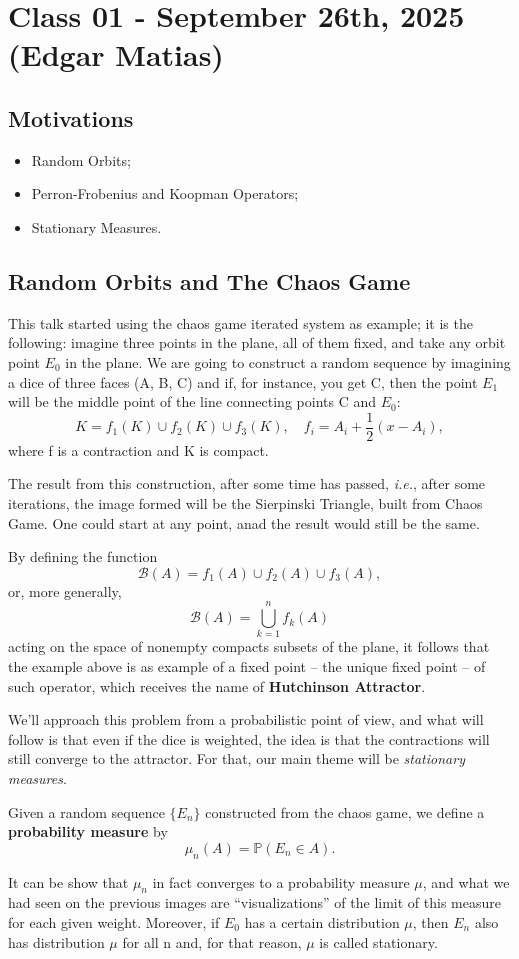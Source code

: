 \documentclass[../stationary_ifs.tex]{subfiles}
\begin{document}
\section{Class 01 - September 26th, 2025 (Edgar Matias)}
\subsection{Motivations}
\begin{itemize}
	\item Random Orbits;
	\item Perron-Frobenius and Koopman Operators;
	\item Stationary Measures.
\end{itemize}
\subsection{Random Orbits and The Chaos Game}
This talk started using the chaos game iterated system as example; it is the following: imagine three points in the plane, all of them fixed,
and take any orbit point \(E_{0}\) in the plane. We are going to construct a random sequence by imagining a dice of three faces (A, B, C) and if, for instance, you get
C, then the point \(E_1\) will be the middle point of the line connecting points C and \(E_{0}\):
\[
	K =f_1(K)\cup f_2(K)\cup f_3(K),\quad f_{i} = A_{i}+\frac{1}{2}(x-A_{i}),
\]
where f is a contraction and K is compact.

The result from this construction, after some time has passed, \textit{i.e.}, after some iterations, the image formed will be the Sierpinski Triangle, built from Chaos Game.
One could start at any point, anad the result would still be the same.

By defining the function
\[
	\mathcal{B}(A) = f_1(A)\cup f_2(A)\cup f_3(A),
\]
or, more generally,
\[
	\mathcal{B}(A) = \bigcup_{k=1}^{n}f_{k}(A)
\]
acting on the space of nonempty compacts subsets of the plane, it follows that the example above is as example of a fixed point -- the unique fixed point -- of such operator,
which receives the name of \textbf{Hutchinson Attractor}.

We'll approach this problem from a probabilistic point of view, and what will follow is that even if the dice is weighted, the idea is that the contractions will still converge
to the attractor. For that, our main theme will be \textit{stationary measures}.

\begin{def*}
	Given a random sequence \(\{E_{n}\}\) constructed from the chaos game, we define a \textbf{probability measure} by
	\[
		\mu_{n}(A) = \mathbb{P}(E_{n}\in A).
	\]
\end{def*}
It can be show that \(\mu_{n}\) in fact converges to a probability measure \(\mu \), and what we had seen on the previous images are ``visualizations'' of the limit of this measure
for each given weight. Moreover, if \(E_{0}\) has a certain distribution \(\mu \), then \(E_{n}\) also has distribution \(\mu \) for all n and, for that reason, \(\mu \) is called stationary.
\end{document}
